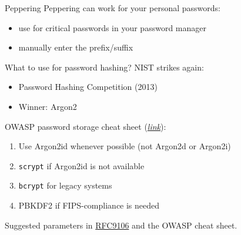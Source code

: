 \begin{frame}{Peppering}
  Peppering can work for your personal passwords:
  \begin{itemize}[<+(1)->]
    \item use for critical passwords in your password manager
    \item manually enter the prefix/suffix
  \end{itemize}
\end{frame}

\begin{frame}{What to use for password hashing?}
  NIST strikes again:
  \begin{itemize}[<+(1)->]
    \item Password Hashing Competition (2013)
    \item Winner: Argon2
  \end{itemize}

  \vspace*{1em}

  \pause
  OWASP password storage cheat sheet (\href{https://cheatsheetseries.owasp.org/cheatsheets/Password_Storage_Cheat_Sheet.html}{\textit{link}}):
  \begin{enumerate}[<+(1)->]
    \item Use Argon2id whenever possible (not Argon2d or Argon2i)
    \item \texttt{scrypt} if Argon2id is not available
    \item \texttt{bcrypt} for legacy systems
    \item PBKDF2 if FIPS-compliance is needed
  \end{enumerate}

  \pause
  Suggested parameters in \href{https://datatracker.ietf.org/doc/html/rfc9106\#name-parameter-choice}{RFC9106} and the OWASP cheat sheet.
\end{frame}


